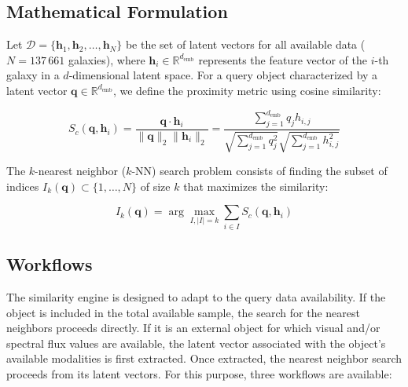 \subsection{Mathematical Formulation}

Let $\mathcal{D} = \{\mathbf{h}_1, \mathbf{h}_2, \dots, \mathbf{h}_N\}$ be the set of latent vectors for all available data ($N = 137\,661$ galaxies), where $\mathbf{h}_i \in \mathbb{R}^{d_{\text{emb}}}$ represents the feature vector of the $i$-th galaxy in a $d$-dimensional latent space. For a query object characterized by a latent vector $\mathbf{q} \in \mathbb{R}^{d_{\text{emb}}}$, we define the proximity metric using cosine similarity:

\begin{equation}
S_c(\mathbf{q}, \mathbf{h}_i) = \frac{\mathbf{q} \cdot \mathbf{h}_i}{\|\mathbf{q}\|_2 \|\mathbf{h}_i\|_2} = \frac{\sum_{j=1}^{d_{\text{emb}}} q_j h_{i,j}}{\sqrt{\sum_{j=1}^{d_{\text{emb}}} q_j^2} \sqrt{\sum_{j=1}^{d_{\text{emb}}} h_{i,j}^2}}
\label{eq:ap_cosine}
\end{equation}

The $k$-nearest neighbor ($k$-NN) search problem consists of finding the subset of indices $I_k(\mathbf{q}) \subset \{1, \dots, N\}$ of size $k$ that maximizes the similarity:

\begin{equation}
I_k(\mathbf{q}) = \arg\max_{I, |I|=k} \sum_{i \in I} S_c(\mathbf{q}, \mathbf{h}_i)
\label{eq:ap_knn}
\end{equation}


\subsection{Workflows}

The similarity engine is designed to adapt to the query data availability. If the object is included in the total available sample, the search for the nearest neighbors proceeds directly. If it is an external object for which visual and/or spectral flux values are available, the latent vector associated with the object's available modalities is first extracted. Once extracted, the nearest neighbor search proceeds from its latent vectors. For this purpose, three workflows are available:

